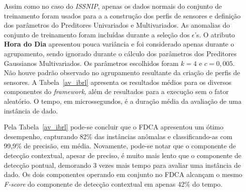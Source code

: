 \documentclass[cic,tc]{iiufrgs}
\begin{document}
Assim como no caso do \textit{ISSNIP}, apenas os dados normais do conjunto de treinamento foram usados para a a construção dos perfis de sensores e definição dos parâmetros do Preditores Univariados e Multivariados. As anomalias do conjunto de treinamento foram incluídas durante a seleção dos $\epsilon$'s. O atributo \textbf{Hora do Dia} apresentou pouca variância e foi considerado apenas durante o agrupamento, sendo ignorado durante o cálculo dos parâmetros dos Preditores Gaussianos Multivariados. Os parâmetros escolhidos foram $k = 4$ e $c = 0,005$. Não houve padrão observado no agrupamento resultante da criação de perfis de sensores. A Tabela~\ref{av_ibrl} apresenta os resultados médios para os diversos componentes do \textit{framework}, além de resultados para a execução sem o fator aleatório. O tempo, em microssegundos, é a duração média da avaliação de uma instância de dado.

\bigskip
\begin{table}[h]
\begin{adjustwidth}{-.5in}{-.5in}
    \caption{Avaliação do FDCA para o conjunto de dados \textit{IBRL}}
    \bigskip
    \begin{center}
    \label{av_ibrl}
    \end{center}
\end{adjustwidth}
\end{table}

\bigskip
\bigskip
Pela Tabela~\ref{av_ibrl} pode-se concluir que o FDCA apresentou um ótimo desempenho, capturando 82\% das instâncias anômalas e classificando-as com 99,9\% de precisão, em média. Novamente, pode-se notar que o componente de detecção contextual, apesar de preciso, é muito mais lento que o componente de detecção pontual, demorando 3 vezes mais tempo para avaliar uma instância de dado. Os dois componentes operando em conjunto no FDCA alcançam o mesmo \textit{F-score} do componente de detecção contextual em apenas 42\% do tempo.
\end{document}
